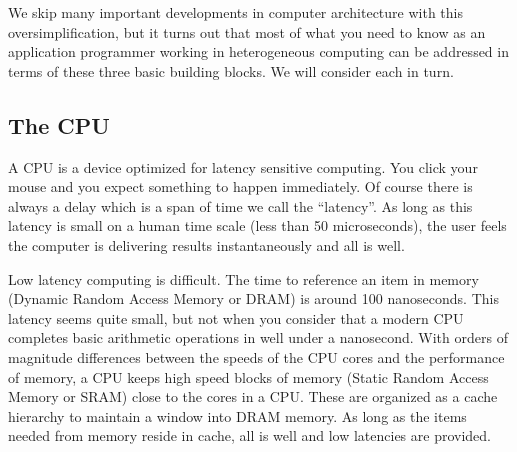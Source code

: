 We skip many important developments in computer architecture with this oversimplification, but 
it turns out that most of what you need to know as an application programmer working in 
heterogeneous computing can be addressed in terms of these three basic building blocks.
We will consider each in turn.

\subsection{The CPU}

A CPU is a device optimized for latency sensitive computing.  You click your mouse and you expect something to happen
immediately.  Of course there is always a delay which is a span of time we call the ``latency''.  As long as this
latency is small on a human time scale (less than 50 microseconds), the user feels the computer is delivering results
instantaneously and  all is well.  

Low latency computing is difficult.  The time to reference an item in memory (Dynamic Random Access Memory or DRAM) is around 100 nanoseconds.  This latency
seems quite small, but not when you consider that a modern CPU completes basic arithmetic operations in well
under a nanosecond.  With orders of magnitude differences between the speeds of the CPU cores and the performance
of memory, a CPU keeps high speed blocks of memory (Static Random Access Memory or SRAM) close to the cores in a CPU.  These are organized as a 
cache hierarchy to maintain a window into DRAM memory.  As long as the items needed from memory 
reside in cache, all is well and low latencies are provided.  

